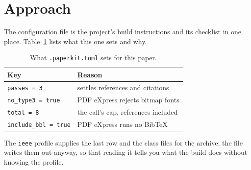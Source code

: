 \section{Approach}

The configuration file is the project's build instructions and its checklist
in one place. Table~\ref{tab:config} lists what this one sets and why.

\begin{table}[t]
  \caption{What \texttt{.paperkit.toml} sets for this paper.}
  \label{tab:config}
  \centering
  \footnotesize
  \begin{tabular}{ll}
    \toprule
    Key & Reason \\
    \midrule
    \texttt{passes = 3} & settles references and citations \\
    \texttt{no\_type3 = true} & PDF eXpress rejects bitmap fonts \\
    \texttt{total = 8} & the call's cap, references included \\
    \texttt{include\_bbl = true} & PDF eXpress runs no BibTeX \\
    \bottomrule
  \end{tabular}
\end{table}

The \texttt{ieee} profile supplies the last row and the class files for the
archive; the file writes them out anyway, so that reading it tells you what
the build does without knowing the profile.
